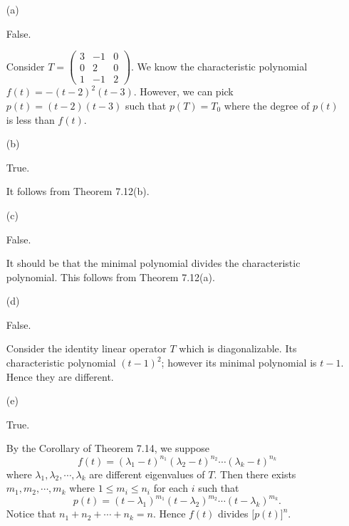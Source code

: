 \begin{Exercise}
	\begin{enumerate}[(a)]
		\item[(a)]
		\begin{answer}
			False.
		\end{answer}
		\begin{solution}
			Consider $T = \begin{pmatrix}
			3 & -1 & 0 \\
			0 & 2 & 0 \\
			1 & -1 & 2
			\end{pmatrix}$. We know the characteristic polynomial $f(t) = -(t-2)^2 (t-3)$. 
			However, we can pick $p(t) = (t-2)(t-3)$ such that $p(T) = T_0$ where the degree of $p(t)$ is less than $f(t)$.
		\end{solution}
		
		\item[(b)]
		\begin{answer}
			True.
		\end{answer}
		\begin{solution}
			It follows from Theorem 7.12(b).
		\end{solution}
		
		\item[(c)]
		\begin{answer}
			False.
		\end{answer}
		\begin{solution}
			It should be that the minimal polynomial divides the characteristic polynomial. This follows from Theorem 7.12(a).
		\end{solution}
		
		\item[(d)]
		\begin{answer}
			False.
		\end{answer}
		\begin{solution}
			Consider the identity linear operator $T$ which is diagonalizable. Its characteristic polynomial $(t-1)^2$; however its minimal polynomial is $t-1$. 
			Hence they are different.
		\end{solution}
		
		\item[(e)]
		\begin{answer}
			True.
		\end{answer}
		\begin{solution}
			By the Corollary of Theorem 7.14, we suppose 
			$$
			f(t) = (\lambda_1-t)^{n_1} (\lambda_2-t)^{n_2} \cdots (\lambda_k-t)^{n_k}
			$$
			where $\lambda_1, \lambda_2, \cdots, \lambda_k$ are different eigenvalues of $T$. Then there exists $m_1, m_2, \cdots, m_k$ where $1\leq m_i \leq n_i$ for each $i$ such that
			$$
			p(t) = (t-\lambda_1)^{m_1} (t-\lambda_2)^{m_2} \cdots (t-\lambda_k)^{m_k}.
			$$
			Notice that $n_1+n_2+\cdots+n_k = n$. 
			Hence $f(t)$ divides $ \big[p(t)\big]^n$.
		\end{solution}
		

\end{enumerate}
\end{Exercise}
